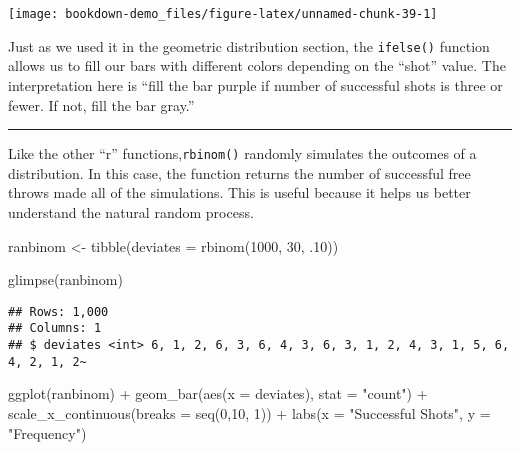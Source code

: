 \documentclass[
]{book}
\newenvironment{Shaded}{\begin{snugshade}}{\end{snugshade}}
\newcommand{\AttributeTok}[1]{\textcolor[rgb]{0.77,0.63,0.00}{#1}}
\newcommand{\DecValTok}[1]{\textcolor[rgb]{0.00,0.00,0.81}{#1}}
\newcommand{\FunctionTok}[1]{\textcolor[rgb]{0.00,0.00,0.00}{#1}}
\newcommand{\NormalTok}[1]{#1}
\newcommand{\OtherTok}[1]{\textcolor[rgb]{0.56,0.35,0.01}{#1}}
\newcommand{\SpecialCharTok}[1]{\textcolor[rgb]{0.00,0.00,0.00}{#1}}
\newcommand{\StringTok}[1]{\textcolor[rgb]{0.31,0.60,0.02}{#1}}
\begin{document}
\begin{center}\texttt{[image: bookdown-demo\_files/figure-latex/unnamed-chunk-39-1]} \end{center}

Just as we used it in the geometric distribution section, the \texttt{ifelse()} function allows us to fill our bars with different colors depending on the ``shot'' value. The interpretation here is ``fill the bar purple if number of successful shots is three or fewer. If not, fill the bar gray.''

\begin{center}\rule{0.5\linewidth}{0.5pt}\end{center}

Like the other ``r'' functions,\texttt{rbinom()} randomly simulates the outcomes of a distribution. In this case, the function returns the number of successful free throws made all of the simulations. This is useful because it helps us better understand the natural random process.

\begin{Shaded}
\begin{Highlighting}[]
\NormalTok{ranbinom }\OtherTok{\textless{}{-}} \FunctionTok{tibble}\NormalTok{(}\AttributeTok{deviates =} \FunctionTok{rbinom}\NormalTok{(}\DecValTok{1000}\NormalTok{, }\DecValTok{30}\NormalTok{, .}\DecValTok{10}\NormalTok{))}

\FunctionTok{glimpse}\NormalTok{(ranbinom)}
\end{Highlighting}
\end{Shaded}

\begin{verbatim}
## Rows: 1,000
## Columns: 1
## $ deviates <int> 6, 1, 2, 6, 3, 6, 4, 3, 6, 3, 1, 2, 4, 3, 1, 5, 6, 4, 2, 1, 2~
\end{verbatim}

\begin{Shaded}
\begin{Highlighting}[]
\FunctionTok{ggplot}\NormalTok{(ranbinom) }\SpecialCharTok{+}
  \FunctionTok{geom\_bar}\NormalTok{(}\FunctionTok{aes}\NormalTok{(}\AttributeTok{x =}\NormalTok{ deviates), }\AttributeTok{stat =} \StringTok{"count"}\NormalTok{) }\SpecialCharTok{+}
  \FunctionTok{scale\_x\_continuous}\NormalTok{(}\AttributeTok{breaks =} \FunctionTok{seq}\NormalTok{(}\DecValTok{0}\NormalTok{,}\DecValTok{10}\NormalTok{, }\DecValTok{1}\NormalTok{)) }\SpecialCharTok{+}
  \FunctionTok{labs}\NormalTok{(}\AttributeTok{x =} \StringTok{"Successful Shots"}\NormalTok{, }\AttributeTok{y =} \StringTok{"Frequency"}\NormalTok{)}
\end{Highlighting}
\end{Shaded}
\end{document}
